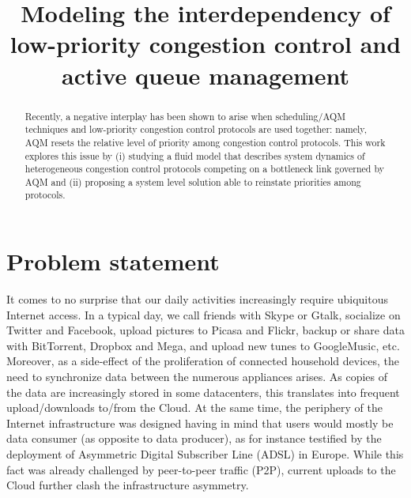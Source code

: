 \documentclass[conference]{IEEEtran}
\begin{document}
\title{Modeling the interdependency of low-priority congestion control and active queue management}
 \author{ 
 }

\maketitle

\begin{abstract}
Recently, a negative interplay has been shown to arise when scheduling/AQM techniques and low-priority congestion control protocols are used together: namely, AQM resets the relative level of priority among congestion control protocols. This work explores this issue by (i) studying a fluid model that describes system dynamics of heterogeneous congestion control protocols competing on a bottleneck link governed by AQM and (ii) proposing a system level solution able to reinstate priorities among protocols.
\end{abstract}

\section{Problem statement} 

It comes to no surprise that our daily activities increasingly require ubiquitous Internet access. In a typical day, we call friends with Skype or Gtalk, socialize on Twitter and Facebook, upload pictures to Picasa and Flickr, backup or share data with BitTorrent, Dropbox and Mega, and upload new tunes to GoogleMusic, etc. Moreover, as a side-effect of the proliferation of connected household devices, the need to synchronize data between the numerous appliances arises. As copies of the data are increasingly stored in some datacenters, this translates into frequent upload/downloads to/from the Cloud.
At the same time, the periphery of the Internet infrastructure was designed having in mind that users would mostly be data consumer (as opposite to data producer), as for instance testified by the deployment of Asymmetric Digital Subscriber Line (ADSL) in Europe. While this fact was already challenged by peer-to-peer traffic (P2P), current uploads to the Cloud further clash the infrastructure asymmetry.
\end{document}
